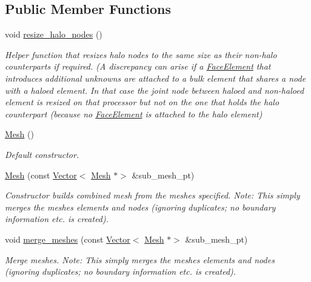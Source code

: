 \subsection*{Public Member Functions}
\begin{DoxyCompactItemize}
\item 
void \hyperlink{classoomph_1_1Mesh_ad1e7104f5ffadce2823c4088327fd402}{resize\+\_\+halo\+\_\+nodes} ()
\begin{DoxyCompactList}\small\item\em Helper function that resizes halo nodes to the same size as their non-\/halo counterparts if required. (A discrepancy can arise if a \hyperlink{classoomph_1_1FaceElement}{Face\+Element} that introduces additional unknowns are attached to a bulk element that shares a node with a haloed element. In that case the joint node between haloed and non-\/haloed element is resized on that processor but not on the one that holds the halo counterpart (because no \hyperlink{classoomph_1_1FaceElement}{Face\+Element} is attached to the halo element) \end{DoxyCompactList}\item 
\hyperlink{classoomph_1_1Mesh_aa4a64cb23aa881dbd67c1b633173494f}{Mesh} ()
\begin{DoxyCompactList}\small\item\em Default constructor. \end{DoxyCompactList}\item 
\hyperlink{classoomph_1_1Mesh_afe38ebeb7d88a020c90636d54ed67180}{Mesh} (const \hyperlink{classoomph_1_1Vector}{Vector}$<$ \hyperlink{classoomph_1_1Mesh}{Mesh} $\ast$$>$ \&sub\+\_\+mesh\+\_\+pt)
\begin{DoxyCompactList}\small\item\em Constructor builds combined mesh from the meshes specified. Note\+: This simply merges the meshes\textquotesingle{} elements and nodes (ignoring duplicates; no boundary information etc. is created). \end{DoxyCompactList}\item 
void \hyperlink{classoomph_1_1Mesh_a67decd5f62fa3177ef5228498a8db233}{merge\+\_\+meshes} (const \hyperlink{classoomph_1_1Vector}{Vector}$<$ \hyperlink{classoomph_1_1Mesh}{Mesh} $\ast$$>$ \&sub\+\_\+mesh\+\_\+pt)
\begin{DoxyCompactList}\small\item\em Merge meshes. Note\+: This simply merges the meshes\textquotesingle{} elements and nodes (ignoring duplicates; no boundary information etc. is created). \end{DoxyCompactList}\item 

\end{DoxyCompactItemize}
